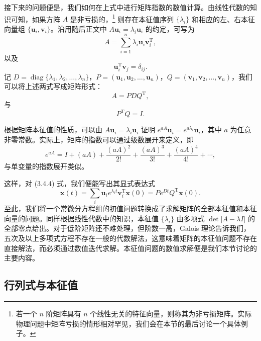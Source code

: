 接下来的问题便是，我们如何在上式中进行矩阵指数的数值计算。由线性代数的知识可知，如果方阵 $A$ 是非亏损的，\footnote{若一个 $n$ 阶矩阵具有 $n$ 个线性无关的特征向量，则称其为非亏损矩阵。实际物理问题中矩阵亏损的情形相对罕见，我们会在本节的最后讨论一个具体例子。} 则存在本征值序列 $\{\lambda_i\}$ 和相应的左、右本征向量组 $\{\bm u_i,\bm v_i\}$。沿用随后正文中 $A\bm u_i=\lambda_i\bm u_i$ 的约定，可写为
\begin{equation}
A=\sum_{i=1}^{n}\lambda_i\bm u_i\bm v_i^{\mathrm T},
\tag{3.4.5}
\end{equation}
以及
\begin{equation}
\bm u_i^{\mathrm T}\bm v_j=\delta_{ij}.
\tag{3.4.6}
\end{equation}
记 $D=\operatorname{diag}\{\lambda_1,\lambda_2,\ldots,\lambda_n\}$，$P=(\bm u_1,\bm u_2,\ldots,\bm u_n)$，$Q=(\bm v_1,\bm v_2,\ldots,\bm v_n)$，我们可以将上述两式写成矩阵形式：
\begin{equation}
A=PDQ^{\mathrm T},
\tag{3.4.7}
\end{equation}
与
\begin{equation}
P^{\mathrm T}Q=I.
\tag{3.4.8}
\end{equation}

根据矩阵本征值的性质，可以由 $A\bm u_i=\lambda_i\bm u_i$ 证明 $e^{aA}\bm u_i=e^{a\lambda_i}\bm u_i$，其中 $a$ 为任意非零常数。实际上，矩阵的指数可以通过级数展开来定义，即
\[
e^{aA}=I+(aA)+\frac{(aA)^2}{2!}+\frac{(aA)^3}{3!}+\frac{(aA)^4}{4!}+\cdots,
\]
与单变量的指数展开类似。

这样，对 (3.4.4) 式，我们便能写出其显式表达式
\begin{equation}
\bm x(t)=\sum_i \bm u_i e^{\lambda_i t}\bm v_i^{\mathrm T}\bm x(0)
=Pe^{Dt}Q^{\mathrm T}\bm x(0).
\tag{3.4.9}
\end{equation}
至此，我们将一个常微分方程组的初值问题转换成了求解矩阵的全部本征值和本征向量的问题。同样根据线性代数中的知识，本征值 $\{\lambda_i\}$ 由多项式 $\det|A-\lambda I|$ 的全部零点给出。对于低阶矩阵还不难处理，但阶数一高，Galois 理论告诉我们，五次及以上多项式方程不存在一般的代数解法，这意味着矩阵的本征值问题不存在直接解法，而必须通过数值迭代求解。本征值问题的数值求解便是我们本节讨论的主要内容。

\subsection{行列式与本征值}

